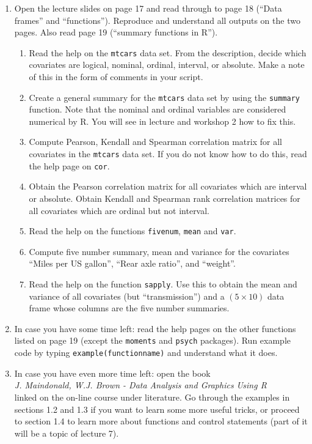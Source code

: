 \begin{enumerate}
\item Open the lecture slides on page 17 and read through to page 18 (``Data frames'' and ``functions''). Reproduce and understand all outputs on the two pages. Also read page 19 (``summary functions in R'').
\begin{enumerate}
\item Read the help on the \texttt{mtcars} data set. From the description, decide which covariates are logical, nominal, ordinal, interval, or absolute. Make a note of this in the form of comments in your script.
\item Create a general summary for the \texttt{mtcars} data set by using the \texttt{summary} function. Note that the nominal and ordinal variables are considered numerical by R. You will see in lecture and workshop 2 how to fix this.
\item Compute Pearson, Kendall and Spearman correlation matrix for all covariates in the \texttt{mtcars} data set. If you do not know how to do this, read the help page on \texttt{cor}.
\item Obtain the Pearson correlation matrix for all covariates which are interval or absolute. Obtain Kendall and Spearman rank correlation matrices for all covariates which are ordinal but not interval.
\item Read the help on the functions \texttt{fivenum}, \texttt{mean} and \texttt{var}.
\item Compute five number summary, mean and variance for the covariates ``Miles per US gallon'', ``Rear axle ratio'', and ``weight''.
\item Read the help on the function \texttt{sapply}. Use this to obtain the mean and variance of all covariates (but ``transmission'') and a $(5\times 10)$ data frame whose columns are the five number summaries.
\end{enumerate}

\item In case you have some time left: read the help pages on the other functions listed on page 19 (except the \texttt{moments} and \texttt{psych} packages). Run example code by typing \texttt{example(functionname)} and understand what it does.
    
\item In case you have even more time left: open the book\\
\emph{J. Maindonald, W.J. Brown - Data Analysis and Graphics Using R}\\
linked on the on-line course under literature. Go through the examples in sections 1.2 and 1.3 if you want to learn some more useful tricks, or proceed to section 1.4 to learn more about functions and control statements (part of it will be a topic of lecture 7).

\end{enumerate}





